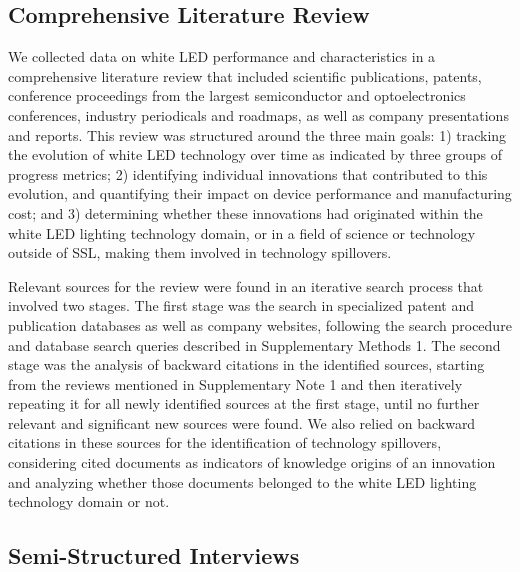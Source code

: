 \documentclass[parskip=full]{article}
\begin{document}
\subsection{Comprehensive Literature Review}

We collected data on white LED performance and characteristics in a comprehensive literature review that included scientific publications, patents, conference proceedings from the largest semiconductor and optoelectronics conferences, industry periodicals and roadmaps, as well as company presentations and reports. This review was structured around the three main goals: 1) tracking the evolution of white LED technology over time as indicated by three groups of progress metrics; 2) identifying individual innovations that contributed to this evolution, and quantifying their impact on device performance and manufacturing cost; and 3) determining whether these innovations had originated within the white LED lighting technology domain, or in a field of science or technology outside of SSL, making them involved in technology spillovers.

Relevant sources for the review were found in an iterative search process that involved two stages. The first stage was the search in specialized patent and publication databases as well as company websites, following the search procedure and database search queries described in Supplementary Methods 1. The second stage was the analysis of backward citations in the identified sources, starting from the reviews mentioned in Supplementary Note 1 and then iteratively repeating it for all newly identified sources at the first stage, until no further relevant and significant new sources were found. We also relied on backward citations in these sources for the identification of technology spillovers, considering cited documents as indicators of knowledge origins of an innovation and analyzing whether those documents belonged to the white LED lighting technology domain or not.

\subsection{Semi-Structured Interviews}
\end{document}
